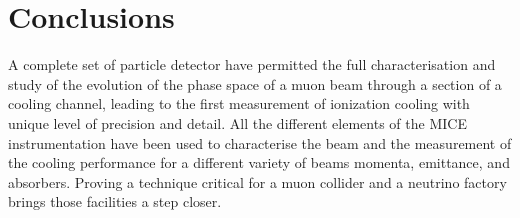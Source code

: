 \graphicspath{{80-Conclusions/Figures/}}

\section{Conclusions}
\label{Sect:Conclusions}

A complete set of particle detector have permitted the full characterisation and study of the evolution of the phase space of a muon beam through a section of a cooling channel, leading to the first measurement of ionization cooling with unique level of precision and detail.
All the different elements of the MICE instrumentation have been used to characterise the beam and the measurement of the cooling performance for a different variety of beams momenta, emittance, and absorbers.
Proving a technique critical for a muon collider and a neutrino factory brings those facilities a step closer.
